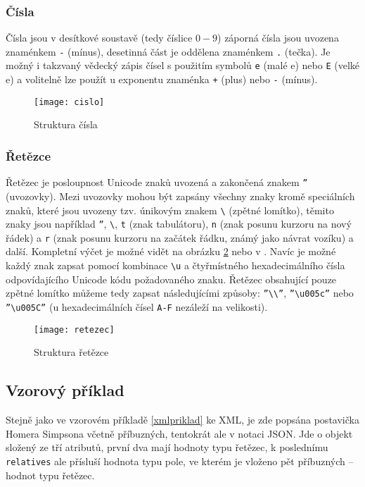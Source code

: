 \subsubsection{Čísla}
Čísla jsou v desítkové soustavě (tedy číslice $0 - 9$) záporná čísla jsou uvozena znaménkem \texttt{-} (mínus), desetinná část je oddělena znaménkem \texttt{.} (tečka). Je možný i takzvaný vědecký zápis čísel s použitím symbolů \texttt{e} (malé e) nebo \texttt{E} (velké e) a volitelně lze použít u exponentu znaménka \texttt{+} (plus) nebo \texttt{-} (mínus).

\begin{figure}[!htb]
\centering
\texttt{[image: cislo]}
\caption{Struktura čísla}
\label{cislo}
\end{figure}

\subsubsection{Řetězce}
Řetězec je posloupnost Unicode znaků uvozená a zakončená znakem \texttt{\textquotedblright} (uvozovky). Mezi uvozovky mohou být zapsány všechny znaky kromě speciálních znaků, které jsou uvozeny tzv. únikovým znakem \texttt{\textbackslash} (zpětné lomítko), těmito znaky jsou například \texttt{\textquotedblright}, \texttt{\textbackslash}, \texttt{t} (znak tabulátoru), \texttt{n} (znak posunu kurzoru na nový řádek) a \texttt{r} (znak posunu kurzoru na začátek řádku, známý jako návrat vozíku) a další. Kompletní výčet je možné vidět na obrázku \ref{retezec} nebo v \cite{json}. Navíc je možné každý znak zapsat pomocí kombinace \texttt{\textbackslash u} a čtyřmístného hexadecimálního čísla odpovídajícího Unicode kódu požadovaného znaku. Řetězec obsahující pouze zpětné lomítko můžeme tedy zapsat následujícími způsoby: \texttt{\textquotedblright\textbackslash\textbackslash\textquotedblright}, \texttt{\textquotedblright\textbackslash u005c\textquotedblright} nebo \texttt{\textquotedblright\textbackslash u005C\textquotedblright} (u hexadecimálních čísel \texttt{A-F} nezáleží na velikosti).

\begin{figure}[!htb]
\centering
\texttt{[image: retezec]}
\caption{Struktura řetězce}
\label{retezec}
\end{figure}

\subsection{Vzorový příklad}
Stejně jako ve vzorovém příkladě \ref{xmlpriklad} ke XML, je zde popsána postavička Homera Simpsona včetně příbuzných, tentokrát ale v notaci JSON. Jde o objekt složený ze tří atributů, první dva mají hodnoty typu řetězec, k poslednímu \texttt{relatives} ale přísluší hodnota typu pole, ve kterém je vloženo pět příbuzných -- hodnot typu řetězec.

